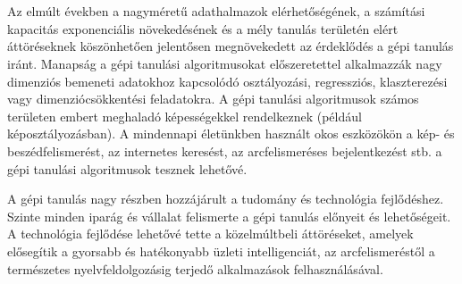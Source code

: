 \section{\bevezetes}


Az elmúlt években a nagyméretű adathalmazok elérhetőségének, a számítási kapacitás exponenciális növekedésének és a mély tanulás területén elért áttöréseknek köszönhetően jelentősen megnövekedett az érdeklődés a gépi tanulás iránt. Manapság a gépi tanulási algoritmusokat előszeretettel alkalmazzák nagy dimenziós bemeneti adatokhoz kapcsolódó osztályozási, regressziós, klaszterezési vagy dimenziócsökkentési feladatokra. A gépi tanulási algoritmusok számos területen embert meghaladó képességekkel rendelkeznek (például képosztályozásban). A mindennapi életünkben használt okos eszközökön a kép- és beszédfelismerést, az internetes keresést, az arcfelismeréses bejelentkezést stb. a gépi tanulási algoritmusok tesznek lehetővé.


A gépi tanulás nagy részben hozzájárult a tudomány és technológia fejlődéshez. Szinte minden iparág és vállalat felismerte a gépi tanulás előnyeit és lehetőségeit. A technológia fejlődése lehetővé tette a közelmúltbeli áttöréseket, amelyek elősegítik a gyorsabb és hatékonyabb üzleti intelligenciát, az arcfelismeréstől a természetes nyelvfeldolgozásig terjedő alkalmazások felhasználásával.


